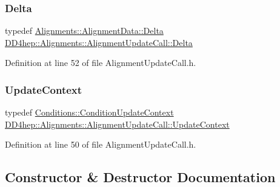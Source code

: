 \subsubsection{\texorpdfstring{Delta}{Delta}}
{\footnotesize\ttfamily typedef \hyperlink{class_d_d4hep_1_1_alignments_1_1_alignment_data_a3e67a5cbb3449006e9552b0f7bd98d45}{Alignments\+::\+Alignment\+Data\+::\+Delta} \hyperlink{class_d_d4hep_1_1_alignments_1_1_alignment_update_call_a06a6522dece2daba45cdc69c079e144c}{D\+D4hep\+::\+Alignments\+::\+Alignment\+Update\+Call\+::\+Delta}}



Definition at line 52 of file Alignment\+Update\+Call.\+h.

\hypertarget{class_d_d4hep_1_1_alignments_1_1_alignment_update_call_a648c995a6ab187911c79a687c8df0fa9}{}\label{class_d_d4hep_1_1_alignments_1_1_alignment_update_call_a648c995a6ab187911c79a687c8df0fa9} 
\subsubsection{\texorpdfstring{Update\+Context}{UpdateContext}}
{\footnotesize\ttfamily typedef \hyperlink{class_d_d4hep_1_1_conditions_1_1_condition_update_context}{Conditions\+::\+Condition\+Update\+Context} \hyperlink{class_d_d4hep_1_1_alignments_1_1_alignment_update_call_a648c995a6ab187911c79a687c8df0fa9}{D\+D4hep\+::\+Alignments\+::\+Alignment\+Update\+Call\+::\+Update\+Context}}



Definition at line 50 of file Alignment\+Update\+Call.\+h.



\subsection{Constructor \& Destructor Documentation}
\hypertarget{class_d_d4hep_1_1_alignments_1_1_alignment_update_call_ad19c943603062f89569a8341b139025f}{}\label{class_d_d4hep_1_1_alignments_1_1_alignment_update_call_ad19c943603062f89569a8341b139025f} 
